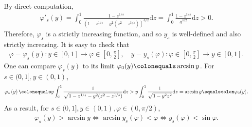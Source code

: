 \documentclass[reqno,10pt]{amsart}
\let\vf=\varphi
\def\th{\theta}
\newcommand{\ben}{\begin{eqnarray}}
\newcommand{\een}{\end{eqnarray}}
\newcommand{\beno}{\begin{eqnarray*}}
\newcommand{\eeno}{\end{eqnarray*}}
\theoremstyle{definition}
\numberwithin{equation}{section}
\begin{document}
By direct computation,
\ben \label{derivative-varphi}
\vf'_s(y)=\int_{0}^{1}\frac{1-z^{1/s}}{(1- z^{1/s} - y^2(z^2-z^{1/s}))^{3/2}}\mathrm{d}z=\int_{0}^{1}\frac{1-z^{1/s}}{g^{3/2}}\mathrm{d}z>0.
\een
Therefore, $\vf_s$ is a strictly increasing function, and so $y_s$ is well-defined and also strictly increasing. It is easy to check that
\beno 
\varphi = \vf_s(y):  y \in [0,1] \to  \varphi \in [0,\frac{\pi}{2}], \quad 	
y = y_s(\varphi): \varphi \in [0,\frac{\pi}{2}] \to y \in [0,1] .
\eeno 
One can 
compare $\varphi_s(y)$ to its limit $\varphi_0(y) \colonequals \arcsin y$.  For $s\in(0,1], y \in (0,1)$, 
\ben \label{comparison-varphi}
\varphi_s\left(y\right) \colonequals   y \int_{0}^{1}  \frac{1}{\sqrt{1- z^{1/s} - y^2(z^2-z^{1/s})
}} \mathrm{d}z>y\int_{0}^{1}\frac{1}{\sqrt{1-y^{2}z^{2}}}\mathrm{d}z=\arcsin y \equalscolon \varphi_0(y).
\een
As a result,  for $s\in(0,1], y \in (0,1), \vf \in (0,\pi/2)$, 
\ben\label{relation of sin vf and y}
\varphi_s\left(y\right)>\arcsin y\iff \arcsin y_s(\vf)<\vf \iff y_s(\vf)<\sin\vf .
\een






%
%
%
\end{document}
